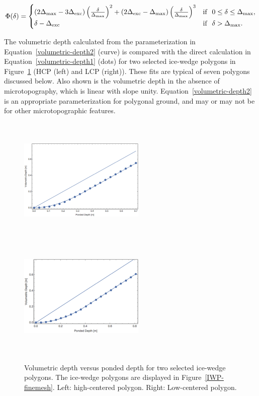 %
\begin{equation}\label{volumetric-depth2}
\Phi (\delta) =
\begin{cases} (2 \Delta_\text{max} - 3 \Delta_\text{exc}) \left(\frac{\delta}{\Delta_\text{max}} \right )^2 + (2 \Delta_\text{exc} -  \Delta_\text{max}) \left(\frac{\delta}{\Delta_\text{max}} \right )^3 & \text{if} \hskip 0.1in 0 \leq \delta \leq \Delta_\text{max}, \\
\delta - \Delta_\text{exc} & \text{if} \hskip .1in \delta > \Delta_\text{max}.
\end{cases}
\end{equation}
%

The volumetric depth calculated from the parameterization in Equation~\ref{volumetric-depth2} (curve) is compared with the direct calculation in Equation~\ref{volumetric-depth1} (dots) for two selected ice-wedge polygons in Figure~\ref{volumetric-depth-fig1} (HCP (left) and LCP (right)).
These fits are typical of seven polygons discussed below.
Also shown is the volumetric depth in the absence of microtopography, which is linear with slope unity.
Equation~\ref{volumetric-depth2} is an appropriate parameterization for polygonal ground, and may or may not be for other microtopographic features.
%
\begin{figure}[!h]
\centering
\includegraphics[width=6cm, height=6cm]{./figures/polygons-finescale/picture2.png} %
\includegraphics[width=6cm, height=6cm]{./figures/polygons-finescale/picture3.png} %
\caption{Volumetric depth versus ponded depth for two selected ice-wedge polygons. The ice-wedge polygons are displayed in Figure~\ref{IWP-finemesh}. Left: high-centered polygon. Right: Low-centered polygon.}
\label{volumetric-depth-fig1}
\end{figure}

